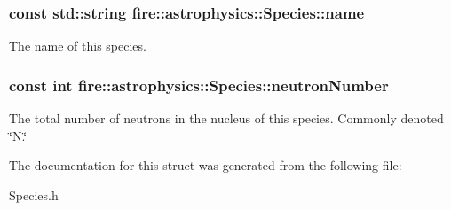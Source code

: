 \subsubsection[{name}]{\setlength{\rightskip}{0pt plus 5cm}const std\+::string fire\+::astrophysics\+::\+Species\+::name}\label{a00039_a4aea10c6b155eaeeb52dedcef2dcf849}
The name of this species. \hypertarget{a00039_acd295953eb640a1354df0be96e63f1cd}{}
\subsubsection[{neutron\+Number}]{\setlength{\rightskip}{0pt plus 5cm}const int fire\+::astrophysics\+::\+Species\+::neutron\+Number}\label{a00039_acd295953eb640a1354df0be96e63f1cd}
The total number of neutrons in the nucleus of this species. Commonly denoted \char`\"{}\+N.\char`\"{} 

The documentation for this struct was generated from the following file\+:\begin{DoxyCompactItemize}
\item 
Species.\+h\end{DoxyCompactItemize}
